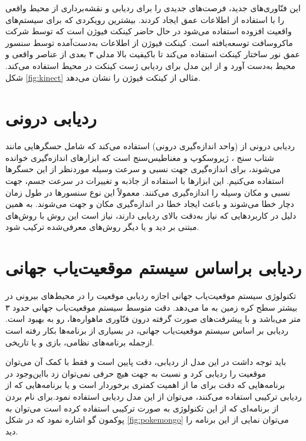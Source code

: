  این فنّاوری‌های جدید، فرصت‌های جدیدی را برای ردیابی و نقشه‌برداری از محیط واقعی را با استفاده از اطلاعات عمق ایجاد کردند. بیشترین رویکردی که برای سیستم‌های واقعیت افزوده استفاده می‌شود در حال حاضر کینکت فیوژن است که توسط شرکت ماکروسافت توسعه‌یافته است. کینکت فیوژن از اطلاعات به‌دست‌آمده توسط سنسور عمق نور ساختار کینکت استفاده می‌کند تا باکیفیت بالا مدلی ۳ بعدی از عناصر واقعی و محیط به‌دست آورد و از این مدل برای ردیابی ژست کینکت در محیط استفاده می‌کند. شکل \ref{fig:kinect} مثالی از کینکت فیوژن را نشان می‌دهد\cite{izadi2011kinectfusion}.

\section{ردیابی درونی}

ردیابی درونی از (واحد اندازه‌گیری درونی) استفاده می‌کند که شامل حسگرهایی مانند شتاب سنج ، ژیروسکوپ  و مغناطیس‌سنج  است که ابزارهای اندازه‌گیری خوانده می‌شوند، برای اندازه‌گیری جهت نسبی و سرعت وسیله موردنظر از این حسگرها استفاده می‌کنیم. این ابزارها با استفاده از جاذبه و تغییرات در سرعت جسم، جهت نسبی و مکان وسیله را اندازه‌گیری می‌کنند. معمولاً این نوع سنسورها در طول زمان دچار خطا می‌شوند و باعث ایجاد خطا در اندازه‌گیری مکان و جهت می‌شوند. به همین دلیل در کاربردهایی که نیاز به‌دقت بالای ردیابی دارند، نیاز است این روش با روش‌های مبتنی بر دید و یا دیگر روش‌های معرفی‌شده ترکیب شود\cite{Billinghurst}.
\section{ردیابی براساس سیستم موقعیت‌یاب جهانی}
تکنولوژی سیستم موقعیت‌یاب جهانی اجازه ردیابی موقعیت را در محیط‌های بیرونی در بیشتر سطح کره زمین به ما می‌دهد. دقت متوسط سیستم موقعیت‌یاب جهانی حدود ۳ متر می‌باشد و با پیشرفت‌های صورت گرفته درون فنّاوری ماهواره‌ها، رو به بهبود است.
ردیابی بر اساس سیستم موقعیت‌یاب جهانی، در بسیاری از برنامه‌ها بکار رفته است ازجمله برنامه‌های نظامی، بازی و یا تاریخی. 

باید توجه داشت در این مدل از ردیابی، دقت پایین است و فقط با کمک آن می‌توان موقعیت را ردیابی کرد و نسبت به جهت هیچ حرفی نمی‌توان زد بااین‌وجود در برنامه‌هایی که دقت برای ما از اهمیت کمتری برخوردار است و یا برنامه‌هایی که از ردیابی ترکیبی استفاده می‌کنند، می‌توان از این مدل ردیابی استفاده نمود\cite{rajeev2019augmented}.برای نام بردن از برنامه‌ای که از این تکنولوژی به صورت ترکیبی استفاده کرده است می‌توان به پوکمون گو اشاره نمود که در شکل \ref{fig:pokemongo} می‌توان نمایی از این برنامه را دید.

